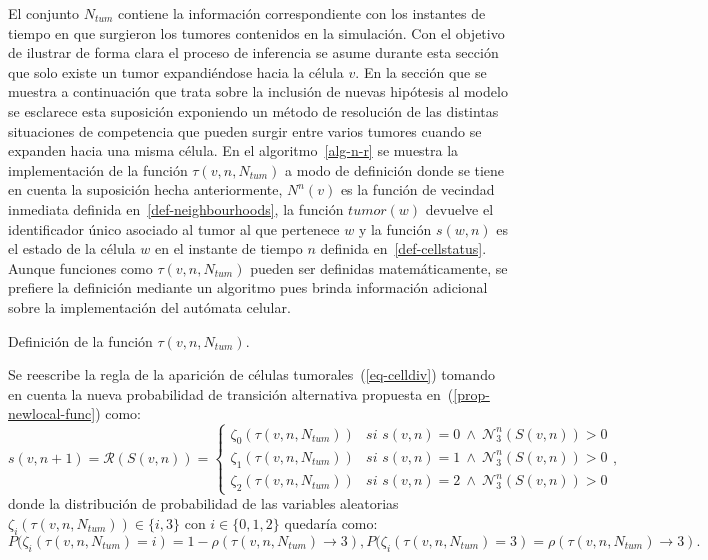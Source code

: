 El conjunto $N_{tum}$ contiene la informaci\'on correspondiente con los instantes de tiempo en que surgieron los tumores contenidos en la simulaci\'on. Con el objetivo de ilustrar de forma clara el proceso de inferencia se asume durante esta secci\'on que solo existe un tumor expandi\'endose hacia la c\'elula $v$. En la secci\'on que se muestra a continuaci\'on que trata sobre la inclusi\'on de nuevas hip\'otesis al modelo se esclarece esta suposici\'on exponiendo un m\'etodo de resoluci\'on de las distintas situaciones de competencia que pueden surgir entre varios tumores cuando se expanden hacia una misma c\'elula. En el algoritmo~\ref{alg-n-r} se muestra la implementaci\'on de la funci\'on $\tau(v,n,N_{tum})$ a modo de definici\'on donde se tiene en cuenta la suposici\'on hecha anteriormente, $N^n(v)$ es la funci\'on de vecindad inmediata definida en~\ref{def-neighbourhoods}, la funci\'on $tumor(w)$ devuelve el identificador \'unico asociado al tumor al que pertenece $w$ y la funci\'on $s(w,n)$ es el estado de la c\'elula $w$ en el instante de tiempo $n$ definida en~\ref{def-cellstatus}. Aunque funciones como $\tau(v,n,N_{tum})$ pueden ser definidas matem\'aticamente, se prefiere la definici\'on mediante un algoritmo pues brinda informaci\'on adicional sobre la implementaci\'on del aut\'omata celular.

\begin{algorithm}[!ht]
\caption{Definici\'on de la funci\'on $\tau(v,n,N_{tum})$.} \label{alg-n-r}
\end{algorithm}

Se reescribe la regla de la aparici\'on de c\'elulas tumorales~(\ref{eq-celldiv}) tomando en cuenta la nueva probabilidad de transici\'on alternativa propuesta en~(\ref{prop-newlocal-func}) como:
\begin{equation}
s(v,n+1)=\mathcal{R}(S(v,n))=\left\lbrace
	\begin{array}{ll}
		\zeta_0(\tau(v,n,N_{tum}))& \textit{si } s(v,n)=0~\wedge~\mathcal{N}_3^n(S(v,n)) > 0 \\
		\zeta_1(\tau(v,n,N_{tum}))& \textit{si } s(v,n)=1~\wedge~\mathcal{N}_3^n(S(v,n)) > 0 \\
		\zeta_2(\tau(v,n,N_{tum}))& \textit{si } s(v,n)=2~\wedge~\mathcal{N}_3^n(S(v,n)) > 0 
	\end{array}
\right., \label{eq-celldiv-2}
\end{equation}
donde la distribuci\'on de probabilidad de las variables aleatorias $\zeta_i(\tau(v,n,N_{tum})) \in \lbrace i,3 \rbrace$ con $i \in \lbrace 0,1,2 \rbrace$ quedar\'ia como:
\begin{subequations}
\begin{equation}
P(\zeta_i(\tau(v,n,N_{tum})=i) = 1 - \rho(\tau(v,n,N_{tum}) \rightarrow 3),
\end{equation}
\begin{equation}
P(\zeta_i(\tau(v,n,N_{tum})=3) = \rho(\tau(v,n,N_{tum}) \rightarrow 3).
\end{equation}
\end{subequations}

